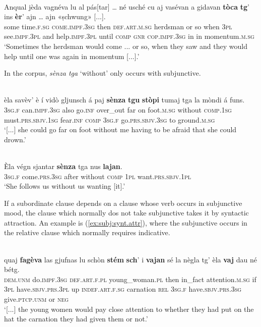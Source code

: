 \ea
\label{ex:toca:ind}
\\
	\gll  Anqual jèda vagnéva lu al pás[tar] … né usché cu aj vasévan a gidavan \textbf{tòca} \textbf{tg}’ ins \textbf{èr}’ ajn … ajn «ṣchwung» [...].\\
some time.\textsc{f.sg} \textsc{come.impf.3sg} then \textsc{def.art.m.sg} herdsman {} or so when \textsc{3pl} see.\textsc{impf.3pl} and help.\textsc{impf.3pl} until \textsc{comp} \textsc{gnr} \textsc{cop.impf.3sg} in {} in momentum.\textsc{m.sg}\\
\glt `Sometimes the herdsman would come ... or so, when they saw and they would help until one was again in momentum [...].'
\z

In the corpus, \textit{sènza tga} `without' only occurs with subjunctive.

\ea
\label{}
\\
\gll  [...] èla savèv’ è í vidò gljunsch á paj \textbf{sènza} \textbf{tgu} \textbf{stòpi} tumaj tga la mòndi á funs. \\
{} \textsc{3sg.f} can.\textsc{impf.3sg} also go.\textsc{inf} over\_out far on foot.\textsc{m.sg} without \textsc{comp.1sg} must.\textsc{prs.sbjv.1sg} fear.\textsc{inf} \textsc{comp} \textsc{3sg.f} go.\textsc{prs.sbjv.3sg} to ground.\textsc{m.sg}\\
\glt `[...] she could go far on foot without me having to be afraid that she could drown.'
\z

\ea
\label{}
 {\citealt[132]{Büchli1966}}\\
\gll Èla végn sjantar \textbf{sènza} tga nus \textbf{lajan}.\\
\textsc{3sg.f} come.\textsc{prs.3sg} after without \textsc{comp} \textsc{1pl} want.\textsc{prs.sbjv.1pl}\\
\glt `She follows us without us wanting [it].'
\z

If a subordinate clause depends on a clause whose verb occurs in subjunctive mood, the clause which normally dos not take subjunctive takes it by syntactic attraction. An example is (\ref{ex:subj:synt.attr}), where the subjunctive occurs in the relative clause which normally requires indicative.

\ea
\label{ex:subj:synt.attr}
\\
	\gll    [...] quaj \textbf{fagèva} las gjufnas lu schòn \textbf{stém} \textbf{sch}’ i \textbf{vajan} sé la nègla tg’ èla \textbf{vaj} dau né bétg.\\
{} \textsc{dem.unm} do.\textsc{impf.3sg} \textsc{def.art.f.pl} young\_woman.\textsc{pl} then in\_fact attention.\textsc{m.sg} if \textsc{3pl}  have.\textsc{sbjv.prs.3pl} up \textsc{indef.art.f.sg} carnation \textsc{rel} \textsc{3sg.f} have.\textsc{sbjv.prs.3sg}  give.\textsc{ptcp.unm} or \textsc{neg} \\
\glt `[...] the young women would pay close attention to whether they had put on the hat the carnation they had given them or not.'
\z

